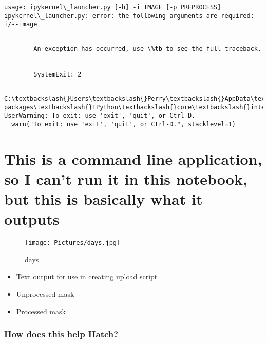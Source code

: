 \documentclass[11pt]{article}
\makeatletter
\def\maxwidth{\ifdim\Gin@nat@width>\linewidth\linewidth
    \else\Gin@nat@width\fi}
\let\Oldincludegraphics\includegraphics
\renewcommand{\includegraphics}[1]{\Oldincludegraphics[width=.8\maxwidth]{#1}}
\providecommand{\tightlist}{%
      \setlength{\itemsep}{0pt}\setlength{\parskip}{0pt}}
\makeatother
\begin{document}
    \begin{Verbatim}[commandchars=\\\{\}]
usage: ipykernel\_launcher.py [-h] -i IMAGE [-p PREPROCESS]
ipykernel\_launcher.py: error: the following arguments are required: -i/--image

    \end{Verbatim}

    \begin{Verbatim}[commandchars=\\\{\}]

        An exception has occurred, use \%tb to see the full traceback.
    

        SystemExit: 2
    

    \end{Verbatim}

    \begin{Verbatim}[commandchars=\\\{\}]
C:\textbackslash{}Users\textbackslash{}Perry\textbackslash{}AppData\textbackslash{}Local\textbackslash{}conda\textbackslash{}conda\textbackslash{}envs\textbackslash{}Classification\textbackslash{}lib\textbackslash{}site-packages\textbackslash{}IPython\textbackslash{}core\textbackslash{}interactiveshell.py:2918: UserWarning: To exit: use 'exit', 'quit', or Ctrl-D.
  warn("To exit: use 'exit', 'quit', or Ctrl-D.", stacklevel=1)

    \end{Verbatim}

    \section{This is a command line application, so I can't run it in this
notebook, but this is basically what it
outputs}\label{this-is-a-command-line-application-so-i-cant-run-it-in-this-notebook-but-this-is-basically-what-it-outputs}

\begin{figure}
\centering
\texttt{[image: Pictures/days.jpg]}
\caption{days}
\end{figure}

\begin{itemize}
\tightlist
\item
  Text output for use in creating upload script
\item
  Unprocessed mask
\item
  Processed mask
\end{itemize}

    \subsubsection{How does this help
Hatch?}\label{how-does-this-help-hatch}
\end{document}

